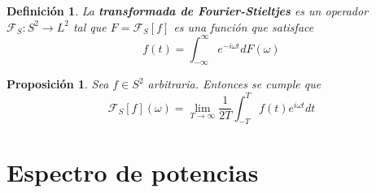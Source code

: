 \documentclass[12pt,letterpaper]{book}
\newtheorem{definicion}{Definición}[chapter]
\newtheorem{proposicion}[teorema]{Proposición}
\newcommand{\intR}{\int_{-\infty}^{\infty}}
\begin{document}
\begin{definicion}
La \textbf{transformada de Fourier-Stieltjes} es un  operador $\mathcal{F}_S:S^2\rightarrow L^2$ tal que $F = \mathcal{F}_S[f]$ es una función que satisface
\begin{equation}
f(t) = \intR e^{-i \omega t} dF(\omega)
\end{equation}
\end{definicion}

\begin{proposicion}
Sea $f \in S^2$ arbitraria. Entonces se cumple que
\begin{equation}
\mathcal{F}_S[f] (\omega) = 
\lim_{T\rightarrow\infty} \frac{1}{2T} \int_{-T}^T f(t) e^{i \omega t} dt
\end{equation}
\end{proposicion}

%



\chapter{Espectro de potencias}
\label{capitulo:espectro}

%
%
\end{document}
